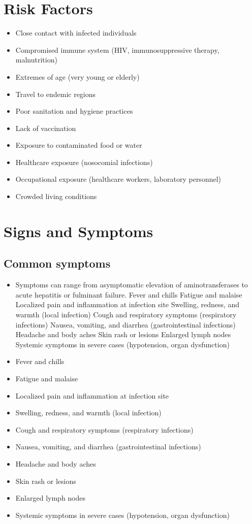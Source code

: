 \section{Risk Factors}


\begin{itemize}[noitemsep]
  \item Close contact with infected individuals
  \item Compromised immune system (HIV, immunosuppressive therapy, malnutrition)
  \item Extremes of age (very young or elderly)
  \item Travel to endemic regions
  \item Poor sanitation and hygiene practices
  \item Lack of vaccination
  \item Exposure to contaminated food or water
  \item Healthcare exposure (nosocomial infections)
  \item Occupational exposure (healthcare workers, laboratory personnel)
  \item Crowded living conditions
\end{itemize}
\section{Signs and Symptoms}

\subsection{Common symptoms}
\begin{itemize}[noitemsep]
  \item Symptoms can range from asymptomatic elevation of aminotransferases to acute hepatitis or fulminant failure. Fever and chills Fatigue and malaise Localized pain and inflammation at infection site Swelling, redness, and warmth (local infection) Cough and respiratory symptoms (respiratory infections) Nausea, vomiting, and diarrhea (gastrointestinal infections) Headache and body aches Skin rash or lesions Enlarged lymph nodes Systemic symptoms in severe cases (hypotension, organ dysfunction)
  \item Fever and chills
  \item Fatigue and malaise
  \item Localized pain and inflammation at infection site
  \item Swelling, redness, and warmth (local infection)
  \item Cough and respiratory symptoms (respiratory infections)
  \item Nausea, vomiting, and diarrhea (gastrointestinal infections)
  \item Headache and body aches
  \item Skin rash or lesions
  \item Enlarged lymph nodes
  \item Systemic symptoms in severe cases (hypotension, organ dysfunction)
\end{itemize}

